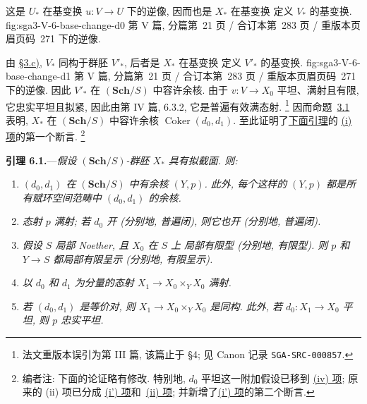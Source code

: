 
这是 \(U_\ast\) 在基变换 \(u:V\to U\) 下的逆像,
因而也是 \(X_\ast\) 在基变换
  {定义 \(V_\ast\) 的基变换.}
  {fig:sga3-V-6-base-change-d0}
  {第 V 篇, 分篇第~21 页 / 合订本第~283 页 / 重版本页眉页码~271}
下的逆像.

由 \hyperref[par:sga3-V-3-c]{\S3.c)}, \(V_\ast\)
同构于群胚 \(V'_\ast\), 后者是 \(X_\ast\) 在基变换
  {定义 \(V'_\ast\) 的基变换.}
  {fig:sga3-V-6-base-change-d1}
  {第 V 篇, 分篇第~21 页 / 合订本第~283 页 / 重版本页眉页码~271}
下的逆像. 因此 \(V'_\ast\) 在 \((\mathbf{Sch}/S)\) 中容许余核.
由于 \(v:V\to X_0\) 平坦、满射且有限,
它忠实平坦且拟紧, 因此由第 IV 篇, 6.3.2, 它是普遍有效满态射.
\footnote{法文重版本误引为第 III 篇, 该篇止于 \S4;
见 Canon 记录 \texttt{SGA-SRC-000857}.}
因而命题~\hyperref[prop:sga3-V-3.1]{3.1} 表明,
\(X_\ast\) 在 \((\mathbf{Sch}/S)\) 中容许余核
\(\operatorname{Coker}(d_0,d_1)\).
至此证明了\hyperref[lem:sga3-V-6.1]{下面引理}的
\hyperref[lem:sga3-V-6.1-i]{(i) 项}的第一个断言.
\footnote{\label{note:sga3-V-32}编者注: 下面的论证略有修改.
特别地, \(d_0\) 平坦这一附加假设已移到
\hyperref[lem:sga3-V-6.1-iv]{(iv) 项}; 原来的 (ii) 项已分成
\hyperref[lem:sga3-V-6.1-ip]{(i') 项}和~\hyperref[lem:sga3-V-6.1-ii]{(ii) 项};
并新增了\hyperref[lem:sga3-V-6.1-ip]{(i') 项}的第二个断言.}

\medskip
{}\label{lem:sga3-V-6.1}%
\noindent\textbf{引理 6.1.}---\emph{假设
\((\mathbf{Sch}/S)\)-群胚 \(X_\ast\) 具有拟截面. 则:}
\begin{enumerate}
\item[\SGAInlineRefTarget{lem:sga3-V-6.1:item:i}(i)]\label{lem:sga3-V-6.1-i}%
\emph{\((d_0,d_1)\) 在 \((\mathbf{Sch}/S)\) 中有余核 \((Y,p)\).
  此外, 每个这样的 \((Y,p)\) 都是所有赋环空间范畴中
  \((d_0,d_1)\) 的余核.}
\item[(i')]\label{lem:sga3-V-6.1-ip}%
\emph{态射 \(p\) 满射; 若 \(d_0\) 开
  (分别地, 普遍闭), 则它也开 (分别地, 普遍闭).}
\item[(ii)]\label{lem:sga3-V-6.1-ii}%
\emph{假设 \(S\) 局部 Noether, 且 \(X_0\) 在 \(S\) 上
  局部有限型 (分别地, 有限型). 则 \(p\) 和 \(Y\to S\)
  都局部有限呈示 (分别地, 有限呈示).}
\item[(iii)]\label{lem:sga3-V-6.1-iii}%
\emph{以 \(d_0\) 和 \(d_1\) 为分量的态射
  \(X_1\to X_0\times_Y X_0\) 满射.}
\item[(iv)]\label{lem:sga3-V-6.1-iv}%
\emph{若 \((d_0,d_1)\) 是等价对, 则
  \(X_1\to X_0\times_Y X_0\) 是同构.
  此外, 若 \(d_0:X_1\to X_0\) 平坦, 则 \(p\) 忠实平坦.}
\end{enumerate}

